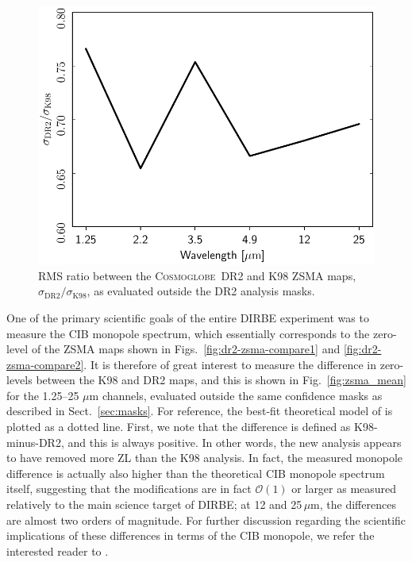 \documentclass[twocolumn]{aa}
\newcommand{\cosmoglobe}{\textsc{Cosmoglobe}}
\begin{document}
\begin{figure}
    \centering
    \includegraphics[width=\linewidth]{figs/zodi_rms_ratio_DIRBE_DR2_v4.pdf}
    \caption{RMS ratio between the \cosmoglobe\ DR2 and K98 ZSMA maps,
      $\sigma_{\mathrm{DR2}}/\sigma_\mathrm{K98}$, as evaluated
      outside the DR2 analysis masks.}
    \label{fig:zsma_rms}
\end{figure}


One of the primary scientific goals of the entire DIRBE experiment was
to measure the CIB monopole spectrum, which essentially corresponds to
the zero-level of the ZSMA maps shown in
Figs.~\ref{fig:dr2-zsma-compare1} and \ref{fig:dr2-zsma-compare2}. It
is therefore of great interest to measure the difference in
zero-levels between the K98 and DR2 maps, and this is shown in
Fig.~\ref{fig:zsma_mean} for the 1.25--25 $\mu$m channels, evaluated
outside the same confidence masks as described in
Sect.~\ref{sec:masks}. For reference, the best-fit theoretical model
of \citet{finke2022} is plotted as a dotted line. First, we note that
the difference is defined as K98-minus-DR2, and this is always
positive. In other words, the new analysis appears to have removed
more ZL than the K98 analysis. In fact, the measured monopole
difference is actually also higher than the theoretical CIB monopole
spectrum itself, suggesting that the modifications are in fact
$\mathcal{O}(1)$ or larger as measured relatively to the main science
target of DIRBE; at 12 and 25$\,\mu$m, the differences are almost two orders of
magnitude. For further discussion regarding the scientific
implications of these differences in terms of the CIB monopole, we
refer the interested reader to \citet{CG02_03}.
\end{document}
